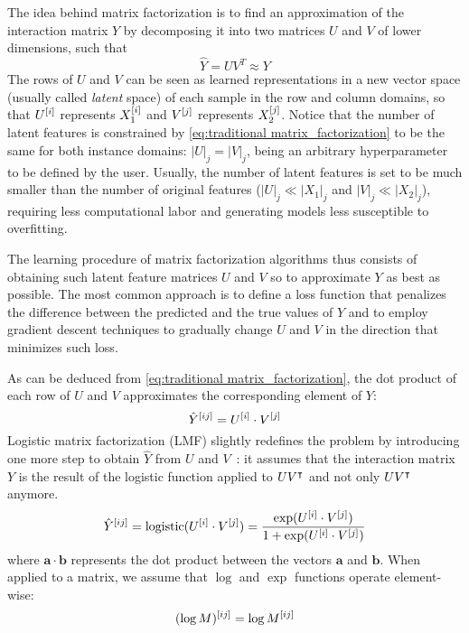 \begin{apendicesenv}
The idea behind matrix factorization is to find an approximation of the interaction matrix $Y$ by decomposing it into two matrices $U$ and $V$ of lower dimensions, such that %
%
\begin{equation}
    \hat Y = U V^T \approx Y
    \label{eq:traditional matrix_factorization}
\end{equation}
%
The rows of $U$ and $V$ can be seen as learned representations in a new vector space (usually called \emph{latent} space) of each sample in the row and column domains, so that $U^{[i]}$ represents $X_1^{[i]}$ and $V^{[j]}$ represents $X_2^{[j]}$.
%
Notice that the number of latent features is constrained by \autoref{eq:traditional matrix_factorization} to be the same for both instance domains: $|U|_j=|V|_j$, being an arbitrary hyperparameter to be defined by the user. Usually, the number of latent features is set to be much smaller than the number of original features ($|U|_j \ll |X_1|_j$ and $|V|_j \ll |X_2|_j$), requiring less computational labor and generating models less susceptible to overfitting.

The learning procedure of matrix factorization algorithms thus consists of obtaining such latent feature matrices $U$ and $V$ so to approximate $Y$ as best as possible. The most common approach is to define a loss function that penalizes the difference between the predicted and the true values of $Y$ and to employ gradient descent techniques to gradually change $U$ and $V$ in the direction that minimizes such loss.
%

As can be deduced from \autoref{eq:traditional matrix_factorization}, the dot product of each row of $U$ and $V$ approximates the corresponding element of $Y$:
%
\begin{equation}
    \hat Y^{[ij]} = U^{[i]} \cdot V^{[j]}
\end{equation}
%
Logistic matrix factorization (LMF) slightly redefines the problem by introducing one more step to obtain $\hat Y$ from $U$ and $V$~\cite{johnsonlogistic}: it assumes that the interaction matrix $Y$ is the result of the logistic function applied to $UV^\intercal$ and not only $UV^\intercal$ anymore.
%
\begin{equation}
    \hat Y^{[ij]} = \text{logistic}(U^{[i]} \cdot V^{[j]})
    = \frac{\exp(U^{[i]} \cdot V^{[j]})}{1 + \exp(U^{[i]} \cdot V^{[j]})}
    \label{eq:lmf_prediction}
\end{equation}
%
where $\mathbf{a} \cdot \mathbf{b}$ represents the dot product between the vectors $\mathbf{a}$ and $\mathbf{b}$. When applied to a matrix, we assume that $\log$ and $\exp$ functions operate element-wise:
%
\begin{equation*}
    (\log M)^{[ij]} = \log M^{[ij]}
\end{equation*}


\end{apendicesenv}

